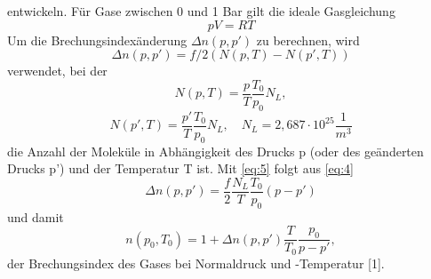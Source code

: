 entwickeln. Für Gase zwischen 0 und 1 Bar gilt die ideale Gasgleichung
\begin{equation}
  pV=RT 
  \label{eq:3}
\end{equation}
Um die Brechungsindexänderung $\Delta n(p,p')$ zu berechnen, wird 
\begin{equation}
  \Delta n(p,p')=f/2(N(p,T)-N(p',T))
  \label{eq:4}
\end{equation}
verwendet, bei der 
\begin{equation}
  N(p,T)=\frac{p}{T}\frac{T_{0}}{p_{0}}N_{L},\nonumber
\end{equation}
\begin{equation}
  N(p',T)=\frac{p'}{T}\frac{T_{0}}{p_{0}}N_{L}, \quad N_{L}=2,687\cdot 10^25\frac{1}{m^3}
  \label{eq:5}
\end{equation}
die Anzahl der Moleküle in Abhängigkeit des Drucks p (oder des geänderten Drucks p') und der Temperatur T ist.
Mit \eqref{eq:5} folgt aus \eqref{eq:4}
\begin{equation}
  \Delta n(p,p')=\frac{f}{2}\frac{N_{L}}{T}\frac{T_{0}}{p_{0}}(p-p') 
  \label{eq:5}
\end{equation}
und damit
\begin{equation}
  n(p_{0},T_{0})=1+\Delta n(p,p')\frac{T}{T_{0}}\frac{p_0}{p-p'},
  \label{eq:6}
\end{equation}
der Brechungsindex des Gases bei Normaldruck und -Temperatur [1].
